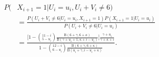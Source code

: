 \begin{equation}
    \begin{aligned}
        P(&X_{i+1}=1|U_i=u_i,U_i+V_i\neq6) \\[6pt]
        &= \frac{P(U_i+V_i\neq6|U_i=u_i,X_{i+1}=1)P(X_{i+1}=1|U_i=u_i)}
        {P(U_i+V_i\neq6|U_i=u_i)}\\[6pt]
        &= \frac{\bigg[ 1 - \binom{11-i}{5-u_i}\frac{\text{B}(6+\gamma,6+\kappa)}{\text{B}(\gamma+u_i+1,\kappa+i-u_i)} \bigg]
        \frac{\gamma+u_i}
        {\gamma+\kappa+i}}
        {1-\binom{12-i}{6-u_i} \frac{\text{B}(6+\gamma,6+\kappa)}{\text{B}(u_i+\gamma,i-u_i+\kappa)}}.
    \end{aligned}
\end{equation}